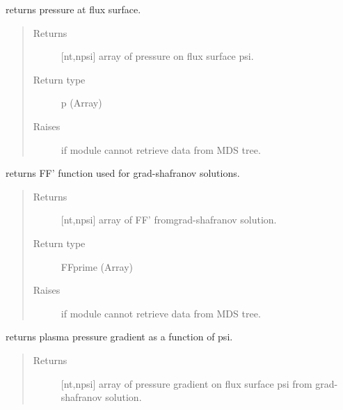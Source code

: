 \documentclass[letterpaper,10pt,english]{sphinxmanual}
\begin{document}
\begin{fulllineitems}
\begin{fulllineitems}
\label{\detokenize{eqtools:eqtools.EFIT.EFITTree.getFluxPres}}
returns pressure at flux surface.
\begin{quote}\begin{description}
\item[{Returns}] \leavevmode
{[}nt,npsi{]} array of pressure on flux surface psi.

\item[{Return type}] \leavevmode
p (Array)

\item[{Raises}] \leavevmode
{} \textendash{} if module cannot retrieve data from MDS tree.

\end{description}\end{quote}

\end{fulllineitems}


\begin{fulllineitems}
\label{\detokenize{eqtools:eqtools.EFIT.EFITTree.getFFPrime}}
returns FF’ function used for grad-shafranov solutions.
\begin{quote}\begin{description}
\item[{Returns}] \leavevmode
{[}nt,npsi{]} array of FF’ fromgrad-shafranov solution.

\item[{Return type}] \leavevmode
FFprime (Array)

\item[{Raises}] \leavevmode
{} \textendash{} if module cannot retrieve data from MDS tree.

\end{description}\end{quote}

\end{fulllineitems}


\begin{fulllineitems}
\label{\detokenize{eqtools:eqtools.EFIT.EFITTree.getPPrime}}
returns plasma pressure gradient as a function of psi.
\begin{quote}\begin{description}
\item[{Returns}] \leavevmode
{[}nt,npsi{]} array of pressure gradient on flux surface
psi from grad-shafranov solution.


\end{description}
\end{quote}
\end{fulllineitems}
\end{fulllineitems}
\end{document}
